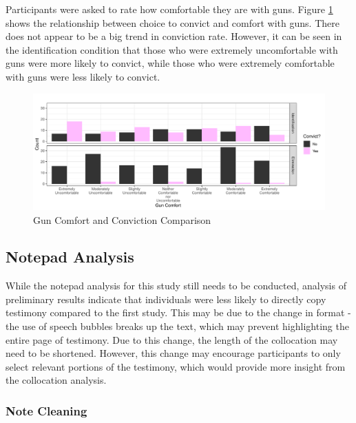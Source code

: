 \documentclass[print]{nuthesis}
\begin{document}
Participants were asked to rate how comfortable they are with guns.
Figure \ref{fig:convictscomfort} shows the relationship between choice to convict and comfort with guns.
There does not appear to be a big trend in conviction rate.
However, it can be seen in the identification condition that those who were extremely uncomfortable with guns were more likely to convict, while those who were extremely comfortable with guns were less likely to convict.

\begin{figure}

{\centering \includegraphics[width=\linewidth]{thesis_files/figure-latex/convictscomfort-1} 

}

\caption{Gun Comfort and Conviction Comparison}\label{fig:convictscomfort}
\end{figure}

\hypertarget{notepad-analysis}{%
\subsection{Notepad Analysis}\label{notepad-analysis}}

While the notepad analysis for this study still needs to be conducted, analysis of preliminary results indicate that individuals were less likely to directly copy testimony compared to the first study.
This may be due to the change in format - the use of speech bubbles breaks up the text, which may prevent highlighting the entire page of testimony.
Due to this change, the length of the collocation may need to be shortened.
However, this change may encourage participants to only select relevant portions of the testimony, which would provide more insight from the collocation analysis.

\hypertarget{note-cleaning}{%
\subsubsection{Note Cleaning}\label{note-cleaning}}
\end{document}
